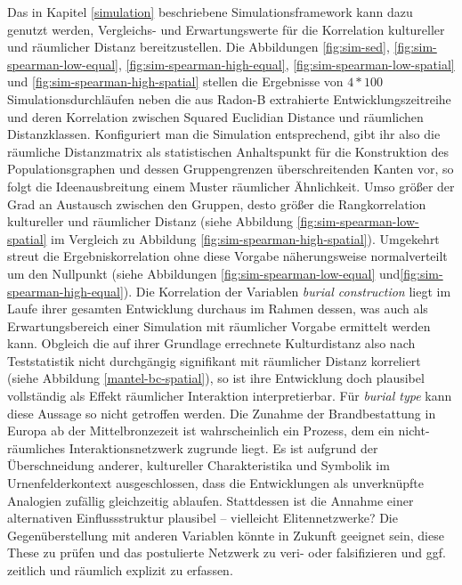 \documentclass[openany,twoside,twocolumn]{book}
\begin{document}
Das in Kapitel \ref{simulation} beschriebene Simulationsframework kann
dazu genutzt werden, Vergleichs- und Erwartungswerte für die Korrelation
kultureller und räumlicher Distanz bereitzustellen. Die Abbildungen
\ref{fig:sim-sed}, \ref{fig:sim-spearman-low-equal},
\ref{fig:sim-spearman-high-equal}, \ref{fig:sim-spearman-low-spatial}
und \ref{fig:sim-spearman-high-spatial} stellen die Ergebnisse von
\(4 * 100\) Simulationsdurchläufen neben die aus Radon-B extrahierte
Entwicklungszeitreihe und deren Korrelation zwischen Squared Euclidian
Distance und räumlichen Distanzklassen. Konfiguriert man die Simulation
entsprechend, gibt ihr also die räumliche Distanzmatrix als
statistischen Anhaltspunkt für die Konstruktion des Populationsgraphen
und dessen Gruppengrenzen überschreitenden Kanten vor, so folgt die
Ideenausbreitung einem Muster räumlicher Ähnlichkeit. Umso größer der
Grad an Austausch zwischen den Gruppen, desto größer die Rangkorrelation
kultureller und räumlicher Distanz (siehe Abbildung
\ref{fig:sim-spearman-low-spatial} im Vergleich zu Abbildung
\ref{fig:sim-spearman-high-spatial}). Umgekehrt streut die
Ergebniskorrelation ohne diese Vorgabe näherungsweise normalverteilt um
den Nullpunkt (siehe Abbildungen \ref{fig:sim-spearman-low-equal}
und\ref{fig:sim-spearman-high-equal}). Die Korrelation der Variablen
\emph{burial construction} liegt im Laufe ihrer gesamten Entwicklung
durchaus im Rahmen dessen, was auch als Erwartungsbereich einer
Simulation mit räumlicher Vorgabe ermittelt werden kann. Obgleich die
auf ihrer Grundlage errechnete Kulturdistanz also nach Teststatistik
nicht durchgängig signifikant mit räumlicher Distanz korreliert (siehe
Abbildung \ref{mantel-bc-spatial}), so ist ihre Entwicklung doch
plausibel vollständig als Effekt räumlicher Interaktion interpretierbar.
Für \emph{burial type} kann diese Aussage so nicht getroffen werden. Die
Zunahme der Brandbestattung in Europa ab der Mittelbronzezeit ist
wahrscheinlich ein Prozess, dem ein nicht-räumliches
Interaktionsnetzwerk zugrunde liegt. Es ist aufgrund der Überschneidung
anderer, kultureller Charakteristika und Symbolik im Urnenfelderkontext
ausgeschlossen, dass die Entwicklungen als unverknüpfte Analogien
zufällig gleichzeitig ablaufen. Stattdessen ist die Annahme einer
alternativen Einflussstruktur plausibel -- vielleicht Elitennetzwerke?
Die Gegenüberstellung mit anderen Variablen könnte in Zukunft geeignet
sein, diese These zu prüfen und das postulierte Netzwerk zu veri- oder
falsifizieren und ggf. zeitlich und räumlich explizit zu erfassen.
\end{document}
